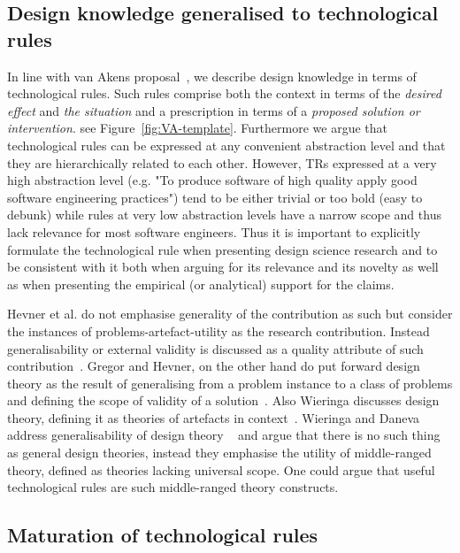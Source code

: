 \documentclass[graybox]{svmult}
\begin{document}
\subsection{Design knowledge generalised to technological rules}
In line with van Akens proposal~\cite{van_aken_management_2004}, we describe design knowledge in terms of technological rules. Such rules comprise both the context in terms of the \emph{desired effect} and \emph{the situation} and a prescription in terms of a \emph{proposed solution or intervention}. see Figure~\ref{fig:VA-template}. Furthermore we argue that technological rules can be expressed at any convenient abstraction level and that they are hierarchically related to each other. However, TRs expressed at a very high abstraction level (e.g. "To produce software of high quality apply good software engineering practices") tend to be either trivial or too bold (easy to debunk) while rules at very low abstraction levels have a narrow scope and thus lack relevance for most software engineers. Thus it is important to explicitly formulate the technological rule when presenting design science research and to be consistent with it both when arguing for its relevance and its novelty as well as when presenting the empirical (or analytical) support for the claims. 

Hevner et al. do not emphasise generality of the contribution as such but consider the instances of problems-artefact-utility as the research contribution. Instead generalisability or external validity is discussed as a quality attribute of such contribution~\cite{hevner_design_2004}. Gregor and Hevner, on the other hand do put forward design theory as the result of generalising from a problem instance to a class of problems and defining the scope of validity of a solution~\cite{gregor_positioning_2013}. Also Wieringa discusses design theory, defining it as theories of artefacts in context~\cite{wieringa_design_2009}. Wieringa and Daneva address generalisability of design theory ~\cite{wieringa_six_2015} and argue that there is no such thing as general design theories, instead they emphasise the utility of middle-ranged theory, defined as theories lacking universal scope. One could argue that useful technological rules are such middle-ranged theory constructs.

\subsection{Maturation of technological rules}
\end{document}
